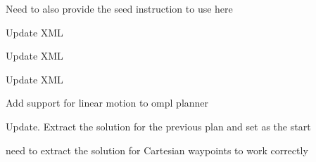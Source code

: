 \begin{DoxyRefList}
\label{todo__todo000021}%
%
Need to also provide the seed instruction to use here  
\item[Member \mbox{\hyperlink{classtesseract__planning_1_1OMPLDefaultPlanProfile_a46c010d4fcdb918631ac92016d3bfccd}{tesseract\+\_\+planning\+::OMPLDefault\+Plan\+Profile\+::OMPLDefault\+Plan\+Profile}} (const tinyxml2\+::\+XMLElement \&xml\+\_\+element)]\label{todo__todo000017}%
%
Update XML 

\label{todo__todo000018}%
%
Update XML  
\item[Member \mbox{\hyperlink{classtesseract__planning_1_1OMPLDefaultPlanProfile_a9ceeaf8d8a01e483992a71b15cb32df4}{tesseract\+\_\+planning\+::OMPLDefault\+Plan\+Profile\+::to\+XML}} (tinyxml2\+::\+XMLDocument \&doc) const override]\label{todo__todo000022}%
%
Update XML  
\item[Member \mbox{\hyperlink{classtesseract__planning_1_1OMPLMotionPlanner_a26896a1ffb6a331553b3e7dec2af8684}{tesseract\+\_\+planning\+::OMPLMotion\+Planner\+::create\+Problems}} (const \mbox{\hyperlink{structtesseract__planning_1_1PlannerRequest}{Planner\+Request}} \&request) const]\label{todo__todo000014}%
%
Add support for linear motion to ompl planner 

\label{todo__todo000015}%
%
Update. Extract the solution for the previous plan and set as the start 

\label{todo__todo000016}%
%
need to extract the solution for Cartesian waypoints to work correctly 


\end{DoxyRefList}

